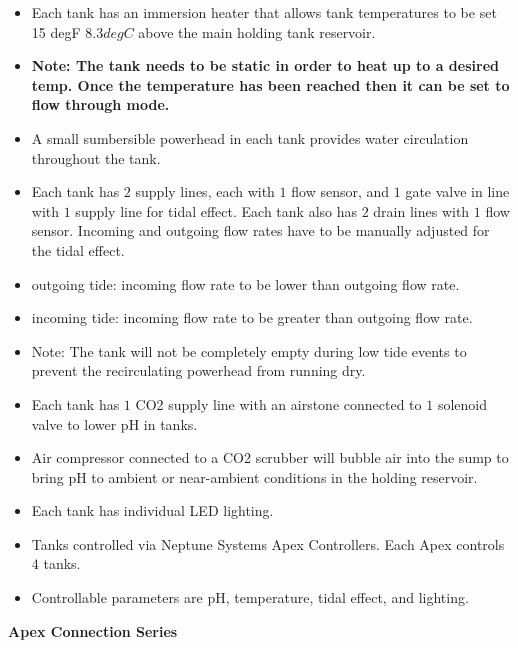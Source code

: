 \documentclass[]{book}
\begin{document}
\begin{itemize}
\item
  Each tank has an immersion heater that allows tank temperatures to be
  set 15 degF \(8.3 degC\) above the main holding tank reservoir.\\
\item
  \textbf{Note: The tank needs to be static in order to heat up to a
  desired temp. Once the temperature has been reached then it can be set
  to flow through mode.}\\
\item
  A small sumbersible powerhead in each tank provides water circulation
  throughout the tank.\\
\item
  Each tank has \(2\) supply lines, each with \(1\) flow sensor, and
  \(1\) gate valve in line with \(1\) supply line for tidal effect. Each
  tank also has \(2\) drain lines with \(1\) flow sensor. Incoming and
  outgoing flow rates have to be manually adjusted for the tidal
  effect.\\
\item
  outgoing tide: incoming flow rate to be lower than outgoing flow
  rate.\\
\item
  incoming tide: incoming flow rate to be greater than outgoing flow
  rate.\\
\item
  Note: The tank will not be completely empty during low tide events to
  prevent the recirculating powerhead from running dry.\\
\item
  Each tank has \(1\) CO2 supply line with an airstone connected to
  \(1\) solenoid valve to lower pH in tanks.\\
\item
  Air compressor connected to a CO2 scrubber will bubble air into the
  sump to bring pH to ambient or near-ambient conditions in the holding
  reservoir.\\
\item
  Each tank has individual LED lighting.\\
\item
  Tanks controlled via Neptune Systems Apex Controllers. Each Apex
  controls \(4\) tanks.\\
\item
  Controllable parameters are pH, temperature, tidal effect, and
  lighting.
\end{itemize}

\textbf{Apex Connection Series}
\end{document}
